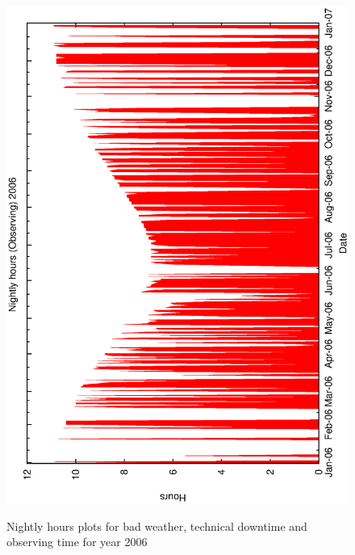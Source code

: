 \begin{figure}[h]
\begin{center}
{    \includegraphics[scale=0.4, angle=-90]{figures/met_nightly_stats_obs2006.eps}
  }
\caption{Nightly hours plots for bad weather, technical downtime and observing time for year 2006}
\end{center}
\end{figure}


